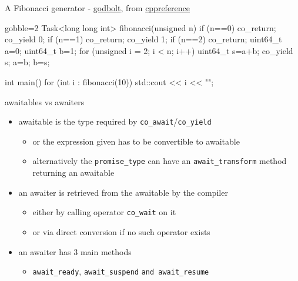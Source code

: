 \begin{frame}[fragile]
  \begin{block}{A Fibonacci generator - \href{https://godbolt.org/z/3Pev1M8se}{\color{blue!50}godbolt}, from \href{https://en.cppreference.com/w/cpp/language/coroutines}{\color{blue!50}cppreference}}
    \scriptsize
     \begin{cppcode*}{gobble=2}
       Task<long long int> fibonacci(unsigned n) {
         if (n==0) co_return;
         co_yield 0;
         if (n==1) co_return;
         co_yield 1;
         if (n==2) co_return;
         uint64_t a=0;
         uint64_t b=1;
         for (unsigned i = 2; i < n; i++) {
           uint64_t s=a+b;
           co_yield s;
           a=b;
           b=s;
         }
       }

       int main() {
         for (int i : fibonacci(10)) {
           std::cout << i << "\n";
         }
       }
    \end{cppcode*}
  \end{block}
\end{frame}

\begin{frame}
  \begin{block}{awaitables vs awaiters}
    \begin{itemize}
    \item awaitable is the type required by \texttt{co_await}/\texttt{co_yield}
      \begin{itemize}
      \item or the expression given has to be convertible to awaitable
      \item alternatively the \texttt{promise_type} can have an \texttt{await_transform} method returning an awaitable
      \end{itemize}
    \item an awaiter is retrieved from the awaitable by the compiler
      \begin{itemize}
      \item either by calling operator \texttt{co_wait} on it
      \item or via direct conversion if no such operator exists
      \end{itemize}
    \item an awaiter has 3 main methods
      \begin{itemize}
      \item \texttt{await_ready}, \texttt{await_suspend} \texttt{and await_resume}
      \end{itemize}
    \end{itemize}
  \end{block}
\end{frame}


